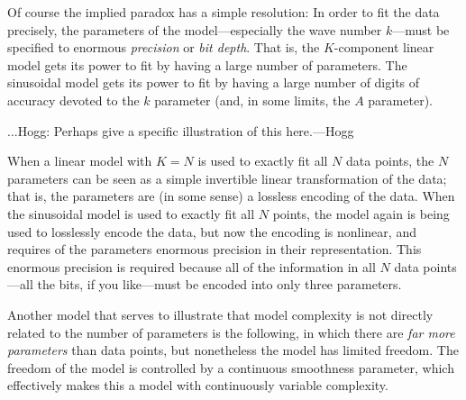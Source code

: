 \documentclass[12pt,twoside]{article}
\begin{document}
Of course the implied paradox has a simple resolution: In order to fit
the data precisely, the parameters of the model---especially the wave
number $k$---must be specified to enormous \emph{precision} or \emph{bit depth}.  That is,
the $K$-component linear model gets its power to fit by having a large
number of parameters.  The sinusoidal model gets its power to fit by
having a large number of digits of accuracy devoted to the $k$
parameter (and, in some limits, the $A$ parameter).

...Hogg:  Perhaps give a specific illustration of this here.---Hogg

When a linear model with $K=N$ is used to exactly fit all $N$ data
points, the $N$ parameters can be seen as a simple invertible linear
transformation of the data; that is, the parameters are (in some
sense) a lossless encoding of the data.  When the sinusoidal model is
used to exactly fit all $N$ points, the model again is being used to
losslessly encode the data, but now the encoding is nonlinear, and
requires of the parameters enormous precision in their representation.
This enormous precision is required because all of the information in
all $N$ data points---all the bits, if you like---must be encoded into
only three parameters.

Another model that serves to illustrate that model complexity is not
directly related to the number of parameters is the following, in
which there are \emph{far more parameters} than data points, but
nonetheless the model has limited freedom.  The freedom of the model
is controlled by a continuous smoothness parameter, which effectively
makes this a model with continuously variable complexity.
\end{document}

